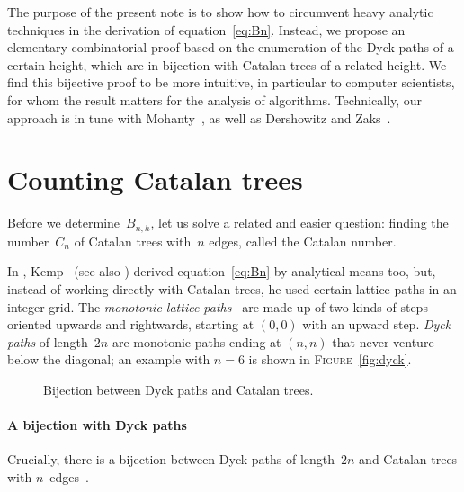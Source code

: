 \documentclass[11pt]{article}
\newcommand\fig{\textsc{Figure}}
\begin{document}
The purpose of the present note is to show how to circumvent heavy
analytic techniques in the derivation of
equation~\eqref{eq:Bn}. Instead, we propose an elementary
combinatorial proof based on the enumeration of the Dyck paths of a
certain height, which are in bijection with Catalan trees of a related
height. We find this bijective proof to be more intuitive, in
particular to computer scientists, for whom the result matters for the
analysis of algorithms. Technically, our approach is in tune with
Mohanty~\cite{Mohanty:1979}, as well as Dershowitz and
Zaks~\cite{DershowitzZaks:1981}.

\section*{Counting Catalan trees}

Before we determine~\(B_{n,h}\), let us solve a related and easier
question: finding the number~\(C_n\) of Catalan trees with~\(n\)
edges, called the Catalan number.

In , Kemp~\cite[p.~64]{Kemp:1984} (see also
\cite{FlajoletNebelProdinger:2006}) derived equation~\eqref{eq:Bn} by
analytical means too, but, instead of working directly with Catalan
trees, he used certain lattice paths in an integer grid. The
\emph{monotonic lattice paths}~\cite{Mohanty:1979,Humphreys:2010} are
made up of two kinds of steps oriented upwards and rightwards,
starting at \((0,0)\) with an upward step. \emph{Dyck paths} of
length~\(2n\) are monotonic paths ending at \((n,n)\) that never
venture below the diagonal; an example with \(n=6\) is shown in
\fig~\ref{fig:dyck}.
\begin{figure}
\centering
{}
\qquad\qquad
{}
\caption{Bijection between Dyck paths and Catalan trees.\label{fig:bijection}}
\end{figure}

\paragraph{A bijection with Dyck paths}

Crucially, there is a bijection between Dyck paths of length~\(2n\)
and Catalan trees with \(n\)~edges~\cite{Klarner}.
\end{document}

